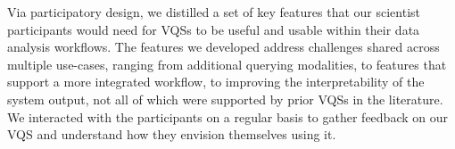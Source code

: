 Via participatory design, we distilled a set of key 
features that our scientist participants would
need for VQSs to be useful and usable within their data 
analysis workflows. 
The features we developed address challenges shared across multiple use-cases, ranging from additional querying modalities, to features that support a more integrated workflow, to improving the interpretability of the system output, not all of which were supported by prior VQSs in the literature. We interacted with the participants on a regular basis to gather feedback on our VQS and understand how they envision themselves using it.

